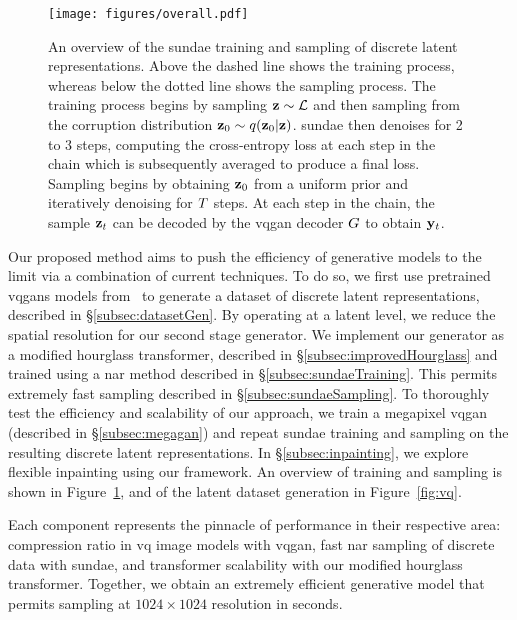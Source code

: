 \begin{figure}[ht]
    \centering
    \texttt{[image: figures/overall.pdf]}
    \caption{
        An overview of the \gls{sundae} training and sampling of discrete latent
        representations. Above the dashed line shows the training process,
        whereas below the dotted line shows the sampling process. The
        training process begins by sampling $\mathbf{z} \sim \mathcal{L}$ and
        then sampling from the corruption distribution $\mathbf{z}_0 \sim
        q(\mathbf{z}_0 \vert \mathbf{z})$. \Gls{sundae} then denoises for 2 to 3
        steps, computing the cross-entropy loss at each step in the chain which
        is subsequently averaged to produce a final loss. Sampling begins by
        obtaining $\mathbf{z}_0$ from a uniform prior and iteratively denoising for
        $T$ steps. At each step in the chain, the sample $\mathbf{z}_t$
        can be decoded by the \gls{vqgan} decoder $G$ to obtain
        $\mathbf{y}_t$.
    }
    \label{fig:overall}
\end{figure}

Our proposed method aims to push the efficiency of generative models to the
limit via a combination of current techniques. To do so, we first use pretrained
\glspl{vqgan} models from~\cite{esser2021taming} to generate a dataset of
discrete latent representations, described in \S\ref{subsec:datasetGen}. By
operating at a latent level, we reduce the spatial resolution for our second
stage generator. We implement our generator as a modified hourglass transformer,
described in \S\ref{subsec:improvedHourglass} and trained using a \gls{nar}
method described in \S\ref{subsec:sundaeTraining}. This permits extremely fast
sampling described in \S\ref{subsec:sundaeSampling}. To thoroughly test the
efficiency and scalability of our approach, we train a megapixel \gls{vqgan}
(described in \S\ref{subsec:megagan}) and repeat \gls{sundae} training and
sampling on the resulting discrete latent representations. In
\S\ref{subsec:inpainting}, we explore flexible inpainting using our framework.
An overview of training and sampling is shown in Figure~\ref{fig:overall}, and
of the latent dataset generation in Figure~\ref{fig:vq}.

Each component represents the pinnacle of performance in their respective area:
compression ratio in \gls{vq} image models with \gls{vqgan}, fast \acrlong{nar}
sampling of discrete data with \gls{sundae}, and transformer scalability with
our modified hourglass transformer. Together, we obtain an extremely efficient
generative model that permits sampling at $1024 \times 1024$ resolution in
seconds.

